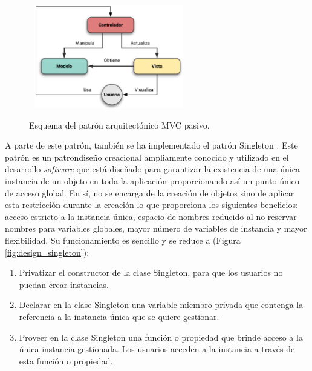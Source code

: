\documentclass[12pt,a4paper, twoside]{report}
\begin{document}
	\begin{figure}[!ht]   
		\caption{Esquema del patrón arquitectónico MVC pasivo.} 
		\begin{center} 
			\includegraphics[width=7cm,height=4.5cm]{Images/design/mvc.png} \\
			\label{fig:design_mvc} 
		\end{center}  
	\end{figure}
	
	A parte de este patrón, también se ha implementado el patrón Singleton \cite{gof95}. Este patrón es un \gls{patrondiseño} creacional ampliamente conocido y utilizado en el desarrollo \textit{software} que está diseñado para garantizar la existencia de una única instancia de un objeto en toda la aplicación proporcionando así un punto único de acceso global. En sí, no se encarga de la creación de objetos sino de aplicar esta restricción durante la creación lo que proporciona los siguientes beneficios: acceso estricto a la instancia única, espacio de nombres reducido al no reservar nombres para variables globales, mayor número de variables de instancia y mayor flexibilidad. Su funcionamiento es sencillo y se reduce a (Figura \ref{fig:design_singleton}):
	
	\begin{enumerate}
		\item Privatizar el constructor de la clase Singleton, para que los usuarios no puedan crear instancias.
		\item Declarar en la clase Singleton una variable miembro privada que contenga la referencia a la instancia única que se quiere gestionar.
		\item Proveer en la clase Singleton una función o propiedad que brinde acceso a la única instancia gestionada. Los usuarios acceden a la instancia a través de esta función o propiedad.
	\end{enumerate}
	
\end{document}
